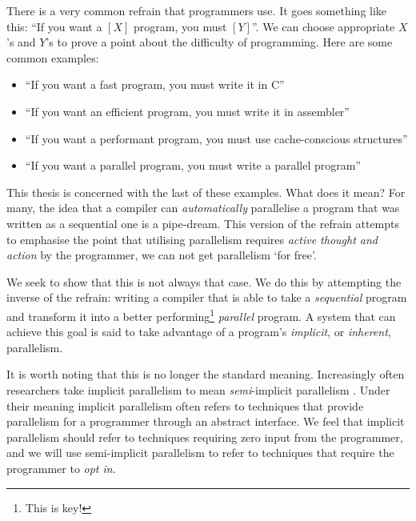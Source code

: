 There is a very common refrain that programmers use. It goes something like
this: ``If you want a $[X]$ program, you must $[Y]$''. We can choose
appropriate $X$'s and $Y$'s to prove a point about the difficulty of
programming. Here are some common examples:

\begin{itemize}
  \item ``If you want a fast program, you must write it in C''
  \item ``If you want an efficient program, you must write it in
            assembler''
  \item ``If you want a performant program, you must use
            cache-conscious structures''
  \item ``If you want a parallel program, you must write a parallel
            program''
\end{itemize}

This thesis is concerned with the last of these examples. What does it mean?
For many, the idea that a compiler can \emph{automatically} parallelise a
program that was written as a sequential one is a pipe-dream. This version of
the refrain attempts to emphasise the point that utilising parallelism requires
\emph{active thought and action} by the programmer, we can not get parallelism
`for free'.

We seek to show that this is not always that case. We do this by attempting
the inverse of the refrain: writing a compiler that is able to take a
\emph{sequential} program and transform it into a better
performing\footnote{This is key!} \emph{parallel} program.  A system that
can achieve this goal is said to take advantage of a program's
\emph{implicit}, or \emph{inherent}, parallelism.


It is worth noting that this is no longer the standard meaning. Increasingly
often researchers take implicit parallelism to mean \emph{semi}-implicit
parallelism . Under their
meaning implicit parallelism often refers to techniques that provide
parallelism for a programmer through an abstract interface. We feel that
implicit parallelism should refer to techniques requiring zero input from the
programmer, and we will use semi-implicit parallelism to refer to techniques
that require the programmer to \emph{opt in}.
